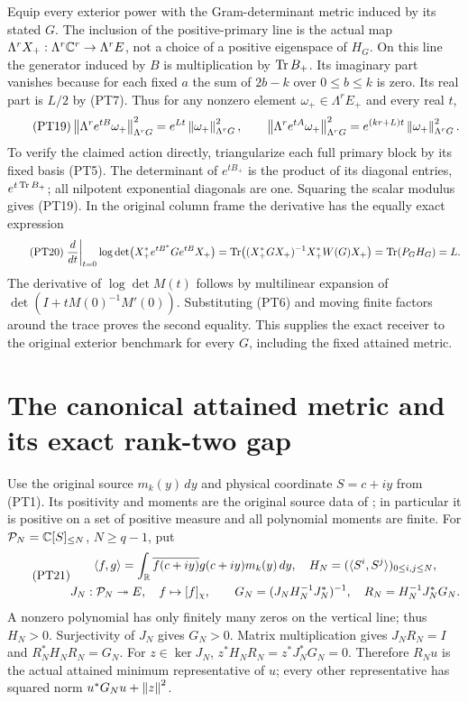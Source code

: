 Equip every exterior power with the Gram-determinant metric induced
by its stated \(G\). The inclusion of the positive-primary line is
the actual map
\(\Lambda^rX_+:\Lambda^r\mathbb C^r\to\Lambda^r E\), not a
choice of a positive eigenspace of \(H_G\). On this line the
generator induced by \(B\) is multiplication by \(\operatorname{Tr} B_+\).
Its imaginary part vanishes because for each fixed \(a\) the
sum of \(2b-k\) over \(0\le b\le k\) is zero. Its real
part is \(L/2\) by (PT7). Thus for any nonzero element
\(\omega_+\in\Lambda^r E_+\) and every real \(t\),
\begin{equation}\tag{PT19}
 \left\lVert\Lambda^r e^{tB}\omega_+\right\rVert_{\Lambda^rG}^{2}
       =e^{Lt}\left\lVert\omega_+\right\rVert_{\Lambda^rG}^{2},\qquad
 \left\lVert\Lambda^r e^{tA}\omega_+\right\rVert_{\Lambda^rG}^{2}
       =e^{(kr+L)t}\left\lVert\omega_+\right\rVert_{\Lambda^rG}^{2}.
\end{equation}
To verify the claimed action directly, triangularize each full
primary block by its fixed basis (PT5). The determinant of
\(e^{tB_+}\) is the product of its diagonal entries,
\(e^{t\operatorname{Tr} B_+}\); all nilpotent exponential diagonals are one.
Squaring the scalar modulus gives (PT19). In the original column
frame the derivative has the equally exact expression
\begin{equation}\tag{PT20}
 \left.\frac{d}{dt}\right|_{t=0}
 \log\det\bigl(X_+^*e^{tB^*}Ge^{tB}X_+\bigr)
 =\operatorname{Tr}\bigl((X_+^*GX_+)^{-1}X_+^*W(G)X_+\bigr)
 =\operatorname{Tr}(P_GH_G)=L.
\end{equation}
The derivative of \(\log\det M(t)\) follows by multilinear
expansion of \(\det(I+tM(0)^{-1}M'(0))\). Substituting (PT6)
and moving finite factors around the trace proves the second
equality. This supplies the exact receiver to the original exterior
benchmark for every \(G\), including the fixed attained metric.

\section{The canonical attained metric and its exact rank-two gap}

Use the original source \(m_k(y)\,dy\) and physical coordinate
\(S=c+iy\) from (PT1). Its positivity and moments are the original
source data of \cite{a03pt:gmf}; in particular it is positive on a set
of positive measure and all polynomial moments are finite. For
\(\mathcal P_N=\mathbb C[S]_{\le N}\), \(N\ge q-1\), put
\begin{equation}\tag{PT21}
 \begin{gathered}
 \langle f,g\rangle=\int_\mathbb R\overline{f(c+iy)}g(c+iy)m_k(y)\,dy,
 \quad H_N=(\langle S^i,S^j\rangle)_{0\le i,j\le N},\\
 J_N:\mathcal P_N\twoheadrightarrow E,\quad f\mapsto[f]_\chi,\qquad
 G_N=(J_NH_N^{-1}J_N^*)^{-1},\quad
 R_N=H_N^{-1}J_N^*G_N.
 \end{gathered}
\end{equation}
A nonzero polynomial has only finitely many zeros on the vertical
line; thus \(H_N>0\). Surjectivity of \(J_N\) gives \(G_N>0\).
Matrix multiplication gives \(J_NR_N=I\) and
\(R_N^*H_NR_N=G_N\). For \(z\in\ker J_N\),
\(z^*H_NR_N=z^*J_N^*G_N=0\). Therefore \(R_Nu\) is the
actual attained minimum representative of \(u\); every other
representative has squared norm \(u^*G_Nu+\left\lVert z\right\rVert^2\).

